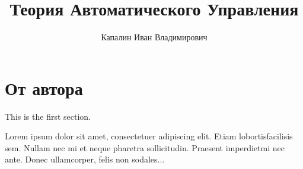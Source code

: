 \documentclass[a4paper,12pt]{extreport}
\title{Теория Автоматического Управления}
\author{Капалин Иван Владимирович}
\date{}
\theoremstyle{plain}
\theoremstyle{definition}
\theoremstyle{remark}
\theoremstyle{plain}
\begin{document}
\maketitle

\tableofcontents

\chapter*{От автора}

This is the first section.
 
Lorem  ipsum  dolor  sit  amet,  consectetuer  adipiscing  
elit.   Etiam  lobortisfacilisis sem.  Nullam nec mi et 
neque pharetra sollicitudin.  Praesent imperdietmi nec ante. 
Donec ullamcorper, felis non sodales...



\end{document}
